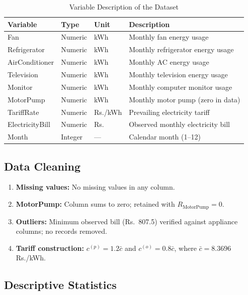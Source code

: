 \documentclass[12pt,a4paper]{article}
\begin{document}
\begin{table}[H]
\centering
\caption{Variable Description of the Dataset}
\begin{tabular}{llll}
\toprule
\textbf{Variable} & \textbf{Type} & \textbf{Unit} & \textbf{Description} \\
\midrule
Fan             & Numeric & kWh       & Monthly fan energy usage \\
Refrigerator    & Numeric & kWh       & Monthly refrigerator energy usage \\
AirConditioner  & Numeric & kWh       & Monthly AC energy usage \\
Television      & Numeric & kWh       & Monthly television energy usage \\
Monitor         & Numeric & kWh       & Monthly computer monitor usage \\
MotorPump       & Numeric & kWh       & Monthly motor pump (zero in data) \\
TariffRate      & Numeric & Rs./kWh   & Prevailing electricity tariff \\
ElectricityBill & Numeric & Rs.       & Observed monthly electricity bill \\
Month           & Integer & ---       & Calendar month (1–12) \\
\bottomrule
\end{tabular}
\end{table}

\subsection{Data Cleaning}

\begin{enumerate}
  \item \textbf{Missing values:} No missing values in any column.
  \item \textbf{MotorPump:} Column sums to zero; retained with $R_{\text{MotorPump}} = 0$.
  \item \textbf{Outliers:} Minimum observed bill (Rs.~807.5) verified against appliance
        columns; no records removed.
  \item \textbf{Tariff construction:} $c^{(p)} = 1.2\bar{c}$ and $c^{(o)} = 0.8\bar{c}$,
        where $\bar{c} = 8.3696$ Rs./kWh.
\end{enumerate}

\subsection{Descriptive Statistics}
\end{document}
